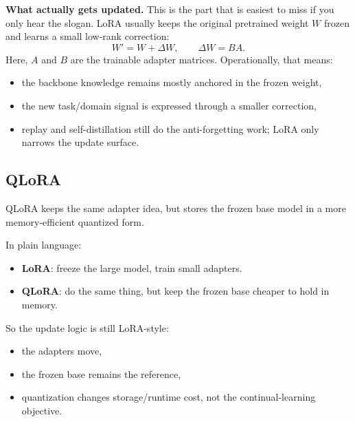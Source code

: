 \textbf{What actually gets updated.}
This is the part that is easiest to miss if you only hear the slogan.
LoRA usually keeps the original pretrained weight $W$ frozen and learns a small low-rank correction:
\[
W' = W + \Delta W, \qquad \Delta W = BA.
\]
Here, $A$ and $B$ are the trainable adapter matrices.
Operationally, that means:
\begin{itemize}
  \item the backbone knowledge remains mostly anchored in the frozen weight,
  \item the new task/domain signal is expressed through a smaller correction,
  \item replay and self-distillation still do the anti-forgetting work; LoRA only narrows the update surface.
\end{itemize}

\subsection{QLoRA}
QLoRA keeps the same adapter idea, but stores the frozen base model in a more memory-efficient quantized form.

In plain language:
\begin{itemize}
  \item \textbf{LoRA}: freeze the large model, train small adapters.
  \item \textbf{QLoRA}: do the same thing, but keep the frozen base cheaper to hold in memory.
\end{itemize}

So the update logic is still LoRA-style:
\begin{itemize}
  \item the adapters move,
  \item the frozen base remains the reference,
  \item quantization changes storage/runtime cost, not the continual-learning objective.
\end{itemize}

